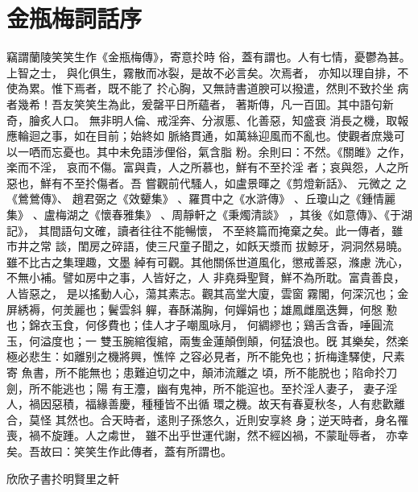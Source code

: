 %

\chapter*{金瓶梅詞話序}


竊謂蘭陵笑笑生作《金瓶梅傳》，寄意扵時
俗，蓋有謂也。人有七情，憂鬱為甚。上智之士，
與化俱生，霧散而冰裂，是故不必言矣。次焉者，
亦知以理自排，不使為累。惟下焉者，既不能了
扵心胸，又無詩書道腴可以撥遣，然則不致扵坐
病者幾希！吾友笑笑生為此，爰罄平日所蘊者，
著斯傳，凡一百囬。其中語句新奇，膾炙人口。
無非明人倫、戒淫奔、分淑慝、化善惡，知盛衰
消長之機，取報應輪迴之事，如在目前；始終如
脈絡貫通，如萬絲迎風而不亂也。使觀者庶幾可
以一哂而忘憂也。其中未免語涉俚俗，氣含脂
粉。余則曰：不然。《關雎》之作，楽而不淫，
哀而不傷。富與貴，人之所慕也，鮮有不至扵淫
者；哀與怨，人之所惡也，鮮有不至扵傷者。吾
嘗觀前代騷人，如盧景暉之《剪燈新話》、
元微之
之《鶯鶯傳》、
趙君弼之《效顰集》
、羅貫中之《水滸傳》
、丘瓊山之《鍾情麗集》
、盧梅湖之《懷春雅集》
、周靜軒之《秉燭清談》
，其後《如意傳》、《于湖記》，
其間語句文確，讀者往往不能暢懷，
不至終篇而掩棄之矣。此一傳者，雖市井之常
談，閨房之碎語，使三尺童子聞之，如飫天漿而
拔鯨牙，洞洞然易曉。雖不比古之集理趣，文墨
綽有可觀。其他關係世道風化，懲戒善惡，滌慮
洗心，不無小補。譬如房中之事，人皆好之，人
非堯舜聖賢，鮮不為所耽。富貴善良，人皆惡之，
是以搖動人心，蕩其素志。觀其高堂大廈，雲窗
霧閣，何深沉也；金屏綉褥，何羙麗也；鬢雲斜
軃，春酥滿胸，何嬋娟也；雄鳳雌凰迭舞，何慇
懃也；錦衣玉食，何侈費也；佳人才子嘲風咏月，
何綢繆也；鷄舌含香，唾圓流玉，何溢度也；一
雙玉腕綰復綰，兩隻金蓮顛倒顛，何猛浪也。旣
其樂矣，然楽極必悲生：如離别之機將興，憔悴
之容必見者，所不能免也；折梅逢驛使，尺素寄
魚書，所不能無也；患難迫切之中，顛沛流離之
頃，所不能脱也；陷命扵刀劍，所不能逃也；陽
有王灋，幽有鬼神，所不能逭也。至扵淫人妻子，
妻子淫人，禍因惡積，福緣善慶，種種皆不出循
環之機。故天有春夏秋冬，人有悲歡離合，莫怪
其然也。合天時者，逺則子孫悠久，近則安享終
身；逆天時者，身名罹喪，禍不旋踵。人之䖏世，
雖不出乎世運代謝，然不經凶禍，不蒙耻辱者，
亦幸矣。吾故曰：笑笑生作此傳者，蓋有所謂也。

{\bigskip\mbox{}\fzqiti\large\hfill 欣欣子書扵明賢里之軒 \quad }






